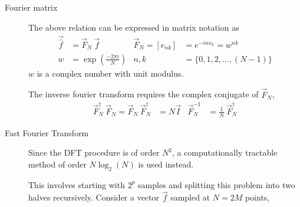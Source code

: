 \begin{description}
    \item[Fourier matrix] The above relation can be expressed in matrix notation as
        \begin{align}
            \vec{\widehat{f}}    & = \vec{F}_N\ \vec{f}                   &
            \vec{F}_N = [e_{nk}] & = e^{-in x_k} = w^{nk}                   \\
            w                    & = \exp\left( \frac{-2\pi i}{N} \right) &
            n,k                  & = \{0, 1, 2, \dots, (N-1)\}
        \end{align}
        $ w $ is a complex number with unit modulus. \par
        The inverse fourier transform requires the complex conjugate of $ \vec{F}_N $,
        \begin{align}
            \vec{F}_N^\dag \ \vec{F}_N = \vec{F}_N\ \vec{F}_N^\dag & = N \vec{I}   &
            \vec{F}_N^{-1}                                         & = \frac{1}{N}
            \ \vec{F}_N^\dag
        \end{align}

    \item[Fast Fourier Transform] Since the DFT procedure is of order $ N^2 $, a
        computationally tractable method of order $ N \log_2(N) $ is used instead. \par
        This involves starting with $ 2^p $ samples and splitting this problem into
        two halves recursively. Consider a vector $ \vec{f} $ sampled at $ N = 2M $
        points, \par


\end{description}
